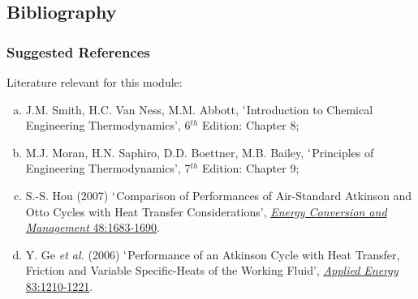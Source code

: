 \documentclass[10pt,compress]{beamer}
\begin{document}
\subsection{Bibliography} 
\begin{frame}
 \frametitle{Suggested References}
  Literature relevant for this module:
  \begin{enumerate}[(a)]
   \item J.M. Smith, H.C. Van Ness, M.M. Abbott, $\lq$Introduction to Chemical Engineering Thermodynamics', 6$^{th}$ Edition: Chapter 8;
   \item M.J. Moran, H.N. Saphiro, D.D. Boettner, M.B. Bailey, $\lq$Principles of Engineering Thermodynamics',  7$^{th}$ Edition: Chapter 9;
   \item S.-S. Hou (2007) $\lq$Comparison of Performances of Air-Standard Atkinson and Otto Cycles with Heat Transfer Considerations', \href{http://dx.doi.org/10.1016/j.enconman.2006.11.001}{{\it Energy Conversion and Management} 48:1683-1690}.
   \item Y. Ge {\it et al.} (2006) $\lq$Performance of an Atkinson Cycle with Heat Transfer, Friction and Variable Specific-Heats of the Working Fluid', \href{http://dx.doi.org/10.1016/j.apenergy.2005.12.003}{{\it Applied Energy} 83:1210-1221}.
  \end{enumerate}
\end{frame}
\end{document}
